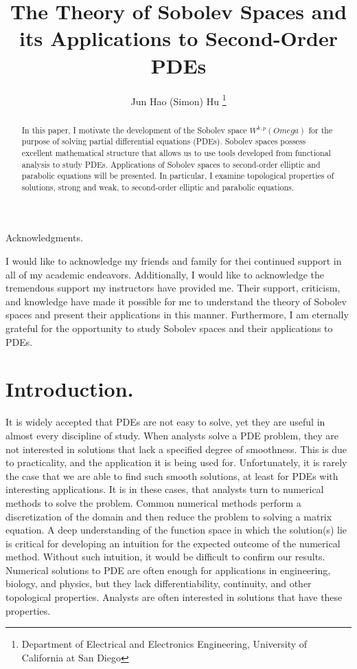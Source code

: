 \documentclass[10pt]{article}
\title{\Large{The Theory of Sobolev Spaces and its Applications to Second-Order PDEs}}
\author{Jun Hao (Simon) Hu \footnote{Department of Electrical and Electronics Engineering, University of California at San Diego}}
\begin{document}
\maketitle

\begin{abstract}
	In this paper, I motivate the development of the Sobolev space $W^{k,p}(Omega)$ for the purpose of solving partial differential equations (PDEs). Sobolev spaces possess excellent mathematical structure that allows us to use tools developed from functional analysis to study PDEs. Applications of Sobolev spaces to second-order elliptic and parabolic equations will be presented. In particular, I examine topological properties of solutions, strong and weak, to second-order elliptic and parabolic equations.
\end{abstract}
\vspace{1in}
\begin{center}
	Acknowledgments.
\end{center}

\small{I would like to acknowledge my friends and family for thei continued support in all of my academic endeavors. Additionally, I would like to acknowledge the tremendous support my instructors have provided me. Their support, criticism, and knowledge have made it possible for me to understand the theory of Sobolev spaces and present their applications in this manner. Furthermore, I am eternally grateful for the opportunity to study Sobolev spaces and their applications to PDEs.}

\newpage 

\tableofcontents

\newpage

\section{Introduction.}
It is widely accepted that PDEs are not easy to solve, yet they are useful in almost every discipline of study. When analysts solve a PDE problem, they are not interested in solutions that lack a specified degree of smoothness. This is due to practicality, and the application it is being used for. Unfortunately, it is rarely the case that we are able to find such smooth solutions, at least for PDEs with interesting applications. It is in these cases, that analysts turn to numerical methods to solve the problem. Common numerical methods perform a discretization of the domain and then reduce the problem to solving a matrix equation. A deep understanding of the function space in which the solution(s) lie is critical for developing an intuition for the expected outcome of the numerical method. Without such intuition, it would be difficult to confirm our results. Numerical solutions to PDE are often enough for applications in engineering, biology, and physics, but they lack differentiability, continuity, and other topological properties. Analysts are often interested in solutions that have these properties. 
\end{document}
